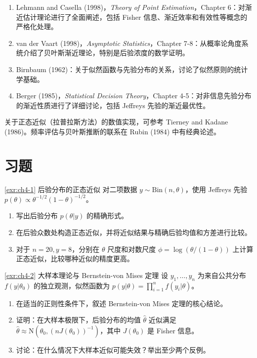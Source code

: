 \begin{enumerate}
  \item Lehmann and Casella (1998)，\emph{Theory of Point Estimation}，Chapter 6：对渐近估计理论进行了全面阐述，包括 Fisher 信息、渐近效率和有效性等概念的严格化处理。
  \item van der Vaart (1998)，\emph{Asymptotic Statistics}，Chapter 7-8：从概率论角度系统介绍了贝叶斯渐近理论，特别是后验浓度的数学证明。
  \item Birnbaum (1962)：关于似然函数与先验分布的关系，讨论了似然原则的统计学基础。
  \item Berger (1985)，\emph{Statistical Decision Theory}，Chapter 4-5：对非信息先验分布的渐近性质进行了详细讨论，包括 Jeffreys 先验的渐近最优性。
\end{enumerate}

关于正态近似（拉普拉斯方法）的数值实现，可参考 Tierney and Kadane (1986)。频率评估与贝叶斯推断的联系在 Rubin (1984) 中有经典论述。

\section{习题}\label{sec:ch4-exercises}

\begin{Exercise}{\ref{exr:ch4-1}  后验分布的正态近似}
对二项数据 $y \sim \mathrm{Bin}(n, \theta)$，使用 Jeffreys 先验 $p(\theta) \propto \theta^{-1/2}(1-\theta)^{-1/2}$。
\begin{enumerate}
  \item 写出后验分布 $p(\theta | y)$ 的精确形式。
  \item 在后验众数处构造正态近似，并将近似结果与精确后验均值和方差进行比较。
  \item 对于 $n = 20, y = 8$，分别在 $\theta$ 尺度和对数尺度 $\phi = \log(\theta/(1-\theta))$ 上计算正态近似，比较哪种近似的精度更高。
\end{enumerate}
\end{Exercise}

\begin{Exercise}{\ref{exr:ch4-2}  大样本理论与 Bernstein-von Mises 定理}
设 $y_1, \ldots, y_n$ 为来自公共分布 $f(y|\theta_0)$ 的独立观测，似然函数为 $p(y|\theta) = \prod_{i=1}^n f(y_i|\theta)$。
\begin{enumerate}
  \item 在适当的正则性条件下，叙述 Bernstein-von Mises 定理的核心结论。
  \item 证明：在大样本极限下，后验分布的均值 $\hat{\theta}$ 近似满足 $\hat{\theta} \approx \mathrm{N}(\theta_0, (nJ(\theta_0))^{-1})$，其中 $J(\theta_0)$ 是 Fisher 信息。
  \item 讨论：在什么情况下大样本近似可能失效？举出至少两个反例。
\end{enumerate}
\end{Exercise}

